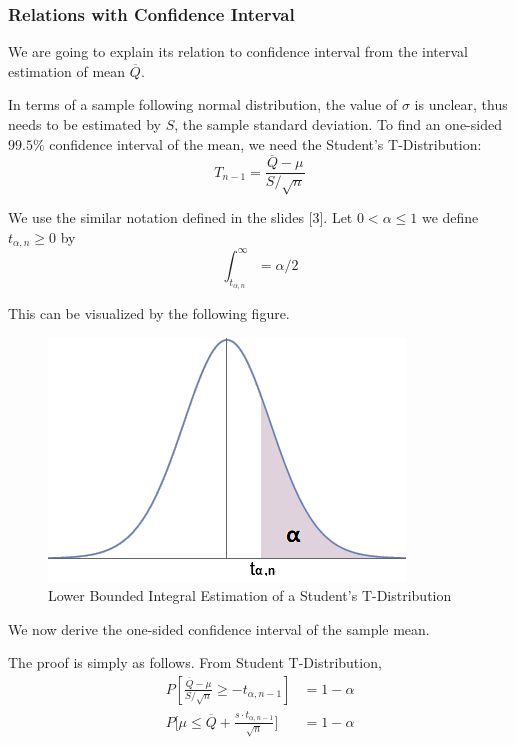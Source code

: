 \documentclass[a4paper]{article}
\begin{document}
\subsubsection{Relations with Confidence Interval}
We are going to explain its relation to confidence interval from the interval estimation of mean $\overline{Q}$.

In terms of a sample following normal distribution, the value of $\sigma$ is unclear, thus needs to be estimated by $S$, the sample standard deviation. To find an one-sided $99.5\%$ confidence interval of the mean, we need the Student's T-Distribution:
$$T_{n-1} = \frac{\overline{Q}-\mu}{S/\sqrt{n}}$$

We use the similar notation defined in the slides [3]. Let $0<\alpha\leq 1$ we define $t_{\alpha,n}\geq 0$ by
$$\int^{\infty}_{t_{\alpha,n}} = \alpha/2$$

This can be visualized by the following figure.
\begin{figure}[!htbp] 
\centering 
\includegraphics[width=0.6\linewidth]{t1l.png}  
\caption{Lower Bounded Integral Estimation of a Student's T-Distribution} 
\label{fig1}
\end{figure}

We now derive the one-sided confidence interval of the sample mean.\\


\newpage

The proof is simply as follows. From Student T-Distribution,
\begin{align*}
P[\frac{\overline{Q}-\mu}{S/\sqrt{n}}\geq -t_{\alpha,n-1}] &= 1-\alpha\\
P\big[\mu \leq \overline{Q}+\frac{s\cdot t_{\alpha,n-1}}{\sqrt{n}}\big] &= 1-\alpha
\end{align*}
\end{document}

